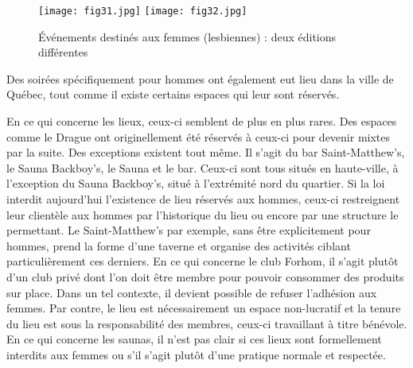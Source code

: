 \begin{figure}
\centering
{}
{\texttt{[image: fig31.jpg]}}
{\texttt{[image: fig32.jpg]}}
\caption{Événements destinés aux femmes (lesbiennes) : deux éditions différentes}\label{figs3132}
\end{figure}

Des soirées spécifiquement pour hommes ont également eut lieu dans la ville de Québec, tout comme il existe certains espaces qui leur sont réservés.

En ce qui concerne les lieux, ceux-ci semblent de plus en plus rares.
Des espaces comme le Drague ont originellement été réservés à ceux-ci pour devenir mixtes par la suite.
Des exceptions existent tout même.
Il s'agit du bar Saint-Matthew's, le Sauna Backboy's, le Sauna et le bar.
Ceux-ci sont tous situés en haute-ville, à l'exception du Sauna Backboy's, situé à l'extrémité nord du quartier.
Si la loi interdit aujourd'hui l'existence de lieu réservés aux hommes, ceux-ci restreignent leur clientèle aux hommes par l'historique du lieu ou encore par une structure le permettant.
Le Saint-Matthew's par exemple, sans être explicitement pour hommes, prend la forme d'une taverne et organise des activités ciblant particulièrement ces derniers.
En ce qui concerne le club Forhom, il s'agit plutôt d'un club privé dont l'on doit être membre pour pouvoir consommer des produits sur place.
Dans un tel contexte, il devient possible de refuser l'adhésion aux femmes.
Par contre, le lieu est nécessairement un espace non-lucratif et la tenure du lieu est sous la responsabilité des membres, ceux-ci travaillant à titre bénévole.
En ce qui concerne les saunas, il n'est pas clair si ces lieux sont formellement interdits aux femmes ou s'il s'agit plutôt d'une pratique normale et respectée.

